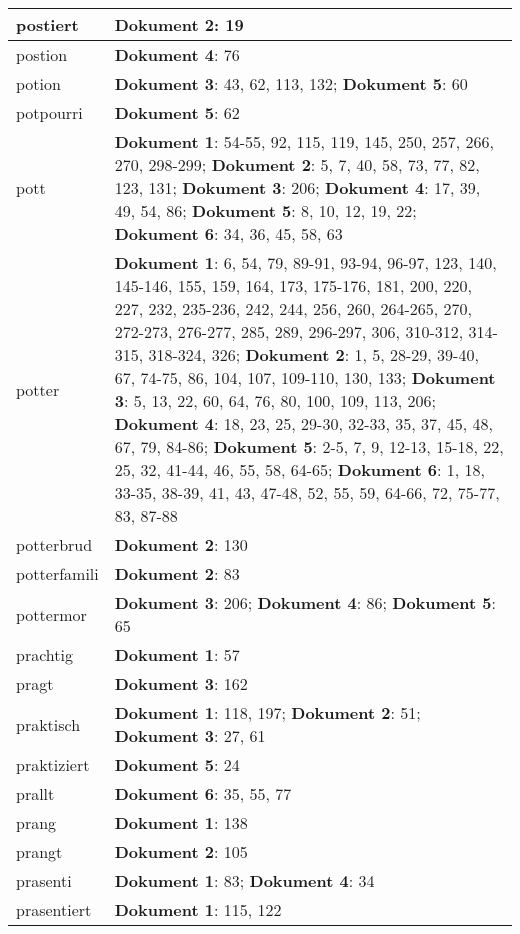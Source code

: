 \documentclass[a5paper]{article}
\begin{document}
\begin{longtable}[l]{|l|p{3in}|}
\hline
postiert & \textbf{Dokument 2}: 19 \\
\hline
postion & \textbf{Dokument 4}: 76 \\
\hline
potion & \textbf{Dokument 3}: 43, 62, 113, 132; \textbf{Dokument 5}: 60 \\
\hline
potpourri & \textbf{Dokument 5}: 62 \\
\hline
pott & \textbf{Dokument 1}: 54-55, 92, 115, 119, 145, 250, 257, 266, 270, 298-299; \textbf{Dokument 2}: 5, 7, 40, 58, 73, 77, 82, 123, 131; \textbf{Dokument 3}: 206; \textbf{Dokument 4}: 17, 39, 49, 54, 86; \textbf{Dokument 5}: 8, 10, 12, 19, 22; \textbf{Dokument 6}: 34, 36, 45, 58, 63 \\
\hline
potter & \textbf{Dokument 1}: 6, 54, 79, 89-91, 93-94, 96-97, 123, 140, 145-146, 155, 159, 164, 173, 175-176, 181, 200, 220, 227, 232, 235-236, 242, 244, 256, 260, 264-265, 270, 272-273, 276-277, 285, 289, 296-297, 306, 310-312, 314-315, 318-324, 326; \textbf{Dokument 2}: 1, 5, 28-29, 39-40, 67, 74-75, 86, 104, 107, 109-110, 130, 133; \textbf{Dokument 3}: 5, 13, 22, 60, 64, 76, 80, 100, 109, 113, 206; \textbf{Dokument 4}: 18, 23, 25, 29-30, 32-33, 35, 37, 45, 48, 67, 79, 84-86; \textbf{Dokument 5}: 2-5, 7, 9, 12-13, 15-18, 22, 25, 32, 41-44, 46, 55, 58, 64-65; \textbf{Dokument 6}: 1, 18, 33-35, 38-39, 41, 43, 47-48, 52, 55, 59, 64-66, 72, 75-77, 83, 87-88 \\
\hline
potterbrud & \textbf{Dokument 2}: 130 \\
\hline
potterfamili & \textbf{Dokument 2}: 83 \\
\hline
pottermor & \textbf{Dokument 3}: 206; \textbf{Dokument 4}: 86; \textbf{Dokument 5}: 65 \\
\hline
prachtig & \textbf{Dokument 1}: 57 \\
\hline
pragt & \textbf{Dokument 3}: 162 \\
\hline
praktisch & \textbf{Dokument 1}: 118, 197; \textbf{Dokument 2}: 51; \textbf{Dokument 3}: 27, 61 \\
\hline
praktiziert & \textbf{Dokument 5}: 24 \\
\hline
prallt & \textbf{Dokument 6}: 35, 55, 77 \\
\hline
prang & \textbf{Dokument 1}: 138 \\
\hline
prangt & \textbf{Dokument 2}: 105 \\
\hline
prasenti & \textbf{Dokument 1}: 83; \textbf{Dokument 4}: 34 \\
\hline
prasentiert & \textbf{Dokument 1}: 115, 122 \\

\end{longtable}
\end{document}
